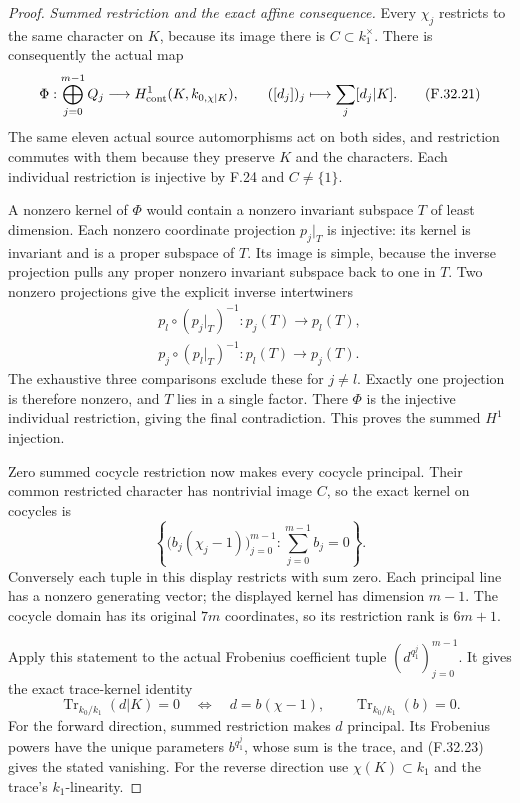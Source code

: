 \begin{proof}
\emph{Summed restriction and the exact affine consequence.}
Every $\chi_j$ restricts to the same
character on $K$, because its image
there is $C\subset k_1^\times$.
There is consequently the actual map
\[
 \Phi:\bigoplus_{j=0}^{m-1}Q_j
       \longrightarrow H^1_{\rm cont}(K,k_{0,\chi|K}),\qquad
                   ([d_j])_j\longmapsto\sum_j[d_j|K].
                                                               \tag{F.32.21}
\]
The same eleven actual source
automorphisms act on both sides, and
restriction commutes with them because
they preserve $K$ and the characters.
Each individual restriction is injective
by F.24 and $C\ne\{1\}$.

A nonzero kernel of $\Phi$ would
contain a nonzero invariant subspace
$T$ of least dimension. Each nonzero
coordinate projection $p_j|_T$ is
injective: its kernel is invariant
and is a proper subspace of $T$.
Its image is simple, because the
inverse projection pulls any proper
nonzero invariant subspace back to one
in $T$. Two nonzero projections give
the explicit inverse intertwiners
\[
 \begin{gathered}
 p_l\circ(p_j|_T)^{-1}:p_j(T)\longrightarrow p_l(T),\\
 p_j\circ(p_l|_T)^{-1}:p_l(T)\longrightarrow p_j(T).
 \end{gathered}                                                \tag{F.32.22}
\]
The exhaustive three comparisons exclude
these for $j\ne l$. Exactly one
projection is therefore nonzero, and
$T$ lies in a single factor. There
$\Phi$ is the injective individual
restriction, giving the final
contradiction. This proves the summed
$H^1$ injection.

Zero summed cocycle restriction now
makes every cocycle principal.
Their common restricted character has
nontrivial image $C$, so the exact
kernel on cocycles is
\[
 \left\{\bigl(b_j(\chi_j-1)\bigr)_{j=0}^{m-1}:
                              \sum_{j=0}^{m-1}b_j=0\right\}.
                                                               \tag{F.32.23}
\]
Conversely each tuple in this display
restricts with sum zero. Each principal
line has a nonzero generating vector;
the displayed kernel has dimension
$m-1$. The cocycle domain has its
original $7m$ coordinates, so its
restriction rank is $6m+1$.

Apply this statement to the actual
Frobenius coefficient tuple
$(d^{q_1^j})_{j=0}^{m-1}$. It gives
the exact trace-kernel identity
\[
 \operatorname{Tr}_{k_0/k_1}(d|K)=0
 \quad\Longleftrightarrow\quad
 d=b(\chi-1),\qquad
                      \operatorname{Tr}_{k_0/k_1}(b)=0.
                                                               \tag{F.32.24}
\]
For the forward direction, summed
restriction makes $d$ principal. Its
Frobenius powers have the unique
parameters $b^{q_1^j}$, whose sum is
the trace, and (F.32.23) gives the
stated vanishing. For the reverse
direction use $\chi(K)\subset k_1$
and the trace's $k_1$-linearity.


\end{proof}
